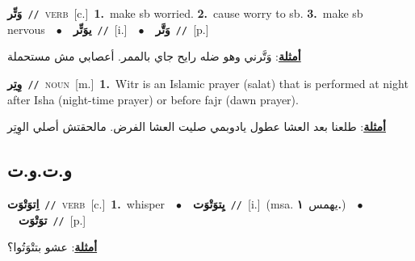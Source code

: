 \documentclass[10pt,a4paper,twoside]{article} %
\begin{document}
\begin{multicols}{2}
{{{{{{{\setlength\topsep{0pt}\textbf{\foreignlanguage{arabic}{وَتِّر}}\ {\color{gray}\texttt{//}\color{black}}\ \textsc{verb}\ [c.]\ \textbf{1.}~make sb worried.  \textbf{2.}~cause worry to sb.  \textbf{3.}~make sb nervous\ \ $\bullet$\ \ \setlength\topsep{0pt}\textbf{\foreignlanguage{arabic}{يوَتِّر}}\ {\color{gray}\texttt{//}\color{black}}\ [i.]\ \ $\bullet$\ \ \setlength\topsep{0pt}\textbf{\foreignlanguage{arabic}{وَتَّر}}\ {\color{gray}\texttt{//}\color{black}}\ [p.]\  \begin{flushright}\color{gray}\foreignlanguage{arabic}{\textbf{\underline{\foreignlanguage{arabic}{أمثلة}}}: وَتَّرني وهو ضله رايح جاي بالممر. أعصابي مش مستحملة}\end{flushright}\color{black}} \vspace{2mm}

{\setlength\topsep{0pt}\textbf{\foreignlanguage{arabic}{وِتِر}}\ {\color{gray}\texttt{//}\color{black}}\ \textsc{noun}\ [m.]\ \textbf{1.}~Witr is an Islamic prayer (salat) that is performed at night after Isha (night-time prayer) or before fajr (dawn prayer).\  \begin{flushright}\color{gray}\foreignlanguage{arabic}{\textbf{\underline{\foreignlanguage{arabic}{أمثلة}}}: طلعنا بعد العشا عطول يادوبمي صليت العشا الفرض. مالحقتش أصلي الوِتِر}\end{flushright}\color{black}} \vspace{2mm}

\vspace{-3mm}
\subsection*{\color{blue}\foreignlanguage{arabic}{و.ت.و.ت}\color{blue}{}} 

{\setlength\topsep{0pt}\textbf{\foreignlanguage{arabic}{اِتوَتْوَت}}\ {\color{gray}\texttt{//}\color{black}}\ \textsc{verb}\ [c.]\ \textbf{1.}~whisper\ \ $\bullet$\ \ \setlength\topsep{0pt}\textbf{\foreignlanguage{arabic}{يِتوَتْوَت}}\ {\color{gray}\texttt{//}\color{black}}\ [i.]\ \color{gray}(msa. \foreignlanguage{arabic}{يهمس}~\foreignlanguage{arabic}{\textbf{١.}})\color{black}\ \ $\bullet$\ \ \setlength\topsep{0pt}\textbf{\foreignlanguage{arabic}{توَتْوَت}}\ {\color{gray}\texttt{//}\color{black}}\ [p.]\  \begin{flushright}\color{gray}\foreignlanguage{arabic}{\textbf{\underline{\foreignlanguage{arabic}{أمثلة}}}: عشو بتتْوَتُوا؟}\end{flushright}\color{black}} \vspace{2mm}

}}}}}}
\end{multicols}
\end{document}

